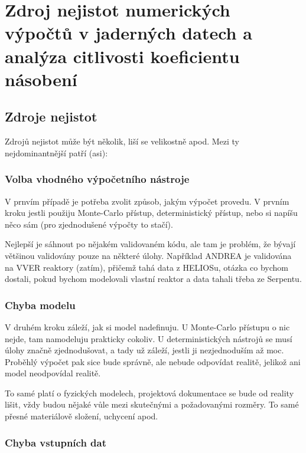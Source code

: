 \section[Citlivostní analýza]{Zdroj nejistot numerických výpočtů v jaderných datech a analýza citlivosti koeficientu násobení}

\subsection{Zdroje nejistot}

Zdrojů nejistot může být několik, liší se velikostně apod. Mezi ty nejdominantnější patří (asi):

\subsubsection{Volba vhodného výpočetního nástroje}

V prnvím případě je potřeba zvolit způsob, jakým výpočet provedu. V prvním kroku jestli použiju Monte-Carlo přístup, deterministický přístup, nebo si napíšu něco sám (pro zjednodušené výpočty to stačí).

Nejlepší je sáhnout po nějakém validovaném kódu, ale tam je problém, že bývají většinou validovány pouze na některé úlohy. Například ANDREA je validována na VVER reaktory (zatím), přičemž tahá data z HELIOSu, otázka co bychom dostali, pokud bychom modelovali vlastní reaktor a data tahali třeba ze Serpentu.

\subsubsection{Chyba modelu}

V druhém kroku záleží, jak si model nadefinuju. U Monte-Carlo přístupu o nic nejde, tam namodeluju prakticky cokoliv. U deterministických nástrojů se musí úlohy značně zjednodušovat, a tady už záleží, jestli ji nezjednoduším až moc. Proběhlý výpočet pak sice bude správně, ale nebude odpovídat realitě, jelikož ani model neodpovídal realitě.

To samé platí o fyzických modelech, projektová dokumentace se bude od reality lišit, vždy budou nějaké vůle mezi skutečnými a požadovanými rozměry. To samé přesné materiálově složení, uchycení apod.

\subsubsection{Chyba vstupních dat}

